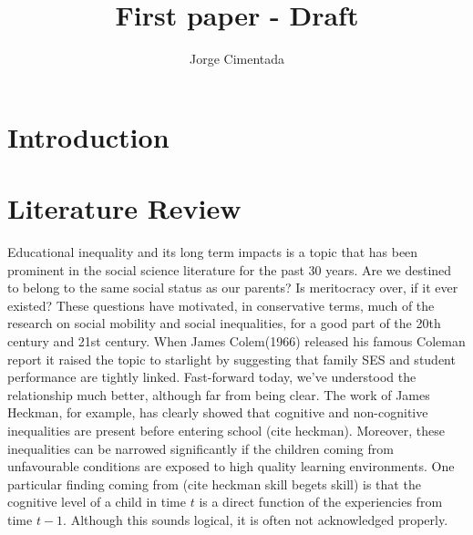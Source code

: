 \documentclass[11pt, a4paper]{article}\usepackage[]{graphicx}\usepackage[]{color}
\title{First paper - Draft}
\author{Jorge Cimentada}
\begin{document}
\setlength{\parindent}{2em}
\setlength{\parskip}{1em}

\maketitle





\tableofcontents












\section{Introduction}

\section{Literature Review}
Educational inequality and its long term impacts is a topic that has been prominent in the social science literature for the past 30 years. Are we destined to belong to the same social status as our parents? Is meritocracy over, if it ever existed? These questions have motivated, in conservative terms, much of the research on social mobility and social inequalities, for a good part of the 20th century and 21st century. When James Colem(1966) released his famous Coleman report it raised the topic to starlight by suggesting that family SES and student performance are tightly linked. Fast-forward today, we've understood the relationship much better, although far from being clear. The work of James Heckman, for example, has clearly showed that cognitive and non-cognitive inequalities are present before entering school (cite heckman). Moreover, these inequalities can be narrowed significantly if the children coming from unfavourable conditions are exposed to high quality learning environments. One particular finding coming from (cite heckman skill begets skill) is that the cognitive level of a child in time \(t\) is a direct function of the experiencies from time \(t-1\). Although this sounds logical, it is often not acknowledged properly.
\end{document}
